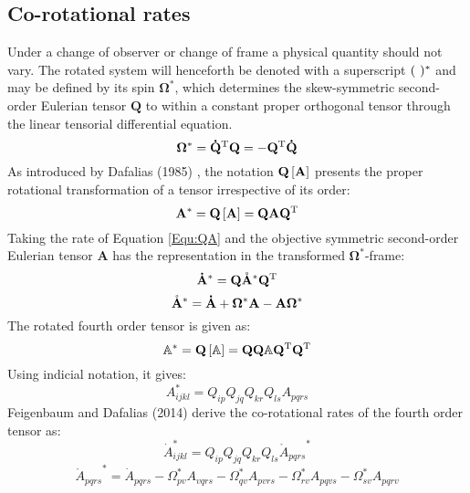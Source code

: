 \subsection{Co-rotational rates}
Under a change of observer or change of frame a physical quantity should not vary.
The rotated system will henceforth be denoted with a superscript $(\rm{\ })^*$ and may be defined by its spin $\mathbf{\Omega}^*$, which determines the skew-symmetric second-order Eulerian tensor $\mathbf{Q}$ to within a constant proper orthogonal tensor through the linear tensorial differential equation.
\begin{equation}
{{\mathbf{\Omega }}^*} = {{{\bf{\dot Q}}}^{\rm{T}}}{\bf{Q}} =  - {{\bf{Q}}^{\rm{T}}}{\bf{\dot Q}}
\end{equation}
As introduced by Dafalias (1985) \cite{dafalias1985plastic}, the notation ${\bf{Q}}\left[ {\bf{A}} \right]$ presents the proper rotational transformation of a tensor irrespective of its order:
\begin{equation}
\label{Equ:QA}
{{\bf{A}}^*} = {\bf{Q}}\left[ {\bf{A}} \right] = {\bf{QA}}{{\bf{Q}}^{\rm{T}}}
\end{equation}
Taking the rate of Equation \ref{Equ:QA} and the objective symmetric second-order Eulerian tensor ${\mathbf{A}}$ has the representation in the transformed ${{\mathbf{\Omega }}^*}$-frame:
\begin{equation}
{{{\bf{\dot A}}}^*} = {\bf{Q}}\mathring {\bf{A}}^* {{\bf{Q}}^{\rm{T}}}
\end{equation}
\begin{equation}
\label{Equ:CorotationalRates2ndOrder}
\mathring {\bf{A}}^*   = {\bf{\dot A}} + {{\bf{\Omega }}^*}{\bf{A}} - {\bf{A}}{{\bf{\Omega }}^*}
\end{equation}
The rotated fourth order tensor is given as:
\begin{equation}
{\mathbb{A}^*} = {\bf{Q}}\left[ \mathbb{A} \right] = {\bf{QQ}}\mathbb{A}{{\bf{Q}}^{\rm{T}}}{{\bf{Q}}^{\rm{T}}}
\end{equation}
Using indicial notation, it gives:
\begin{equation}
A_{ijkl}^* = {Q_{ip}}{Q_{jq}}{Q_{kr}}{Q_{ls}}{A_{pqrs}}
\end{equation}
Feigenbaum and Dafalias (2014) \cite{feigenbaum2014directional} derive the co-rotational rates of the fourth order tensor as:
\begin{equation}
\dot A_{ijkl}^* = {Q_{ip}}{Q_{jq}}{Q_{kr}}{Q_{ls}}{\mathring A _{pqrs}}^*
\end{equation}
\begin{equation}
{\mathring A _{pqrs}}^* = {{\dot A}_{pqrs}} - \Omega _{pv}^*{A_{vqrs}} - \Omega _{qv}^*{A_{pvrs}} - \Omega _{rv}^*{A_{pqvs}} - \Omega _{sv}^*{A_{pqrv}}
\end{equation}
